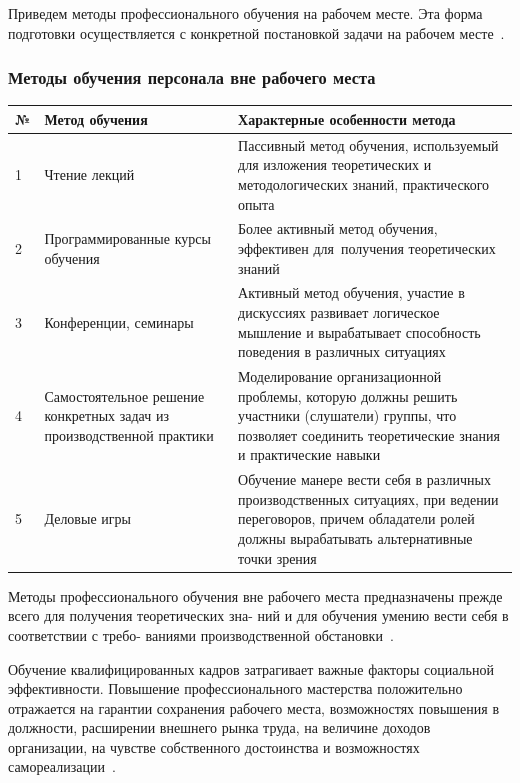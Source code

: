 \documentclass{../industrial-development}
\begin{document}
Приведем методы профессионального обучения на рабочем
месте. Эта форма подготовки осуществляется с конкретной постановкой задачи на рабочем месте~\cite[с.~414]{Kibanov}.

\begin{frame} \frametitle{Методы обучения персонала вне рабочего места}

		\begin{table}[h]
\begin{center}
\begin{tabular}{|p{}|p{4cm}|p{5cm}|}
\hline
\tiny \textbf{№} & \tiny \textbf{Метод обучения} & \tiny \textbf{Характерные особенности метода} \\
\hline
\tiny 1 & \tiny Чтение лекций & \tiny Пассивный метод обучения, используемый для изложения теоретических и методологических знаний, практического опыта  \\
\hline
\tiny 2 & \tiny Программированные курсы обучения & \tiny Более активный метод обучения, эффективен для~получения теоретических знаний  \\
\hline
\tiny 3 & \tiny Конференции, семинары & \tiny Активный метод обучения, участие в дискуссиях развивает логическое мышление и вырабатывает способность поведения в различных ситуациях \\
\hline
\tiny 4 & \tiny Самостоятельное решение конкретных задач из производственной практики & \tiny Моделирование организационной проблемы, которую должны решить участники (слушатели) группы, что позволяет соединить теоретические знания и практические навыки  \\
\hline
\tiny 5 & \tiny Деловые игры & \tiny Обучение манере вести себя в различных производственных ситуациях, при ведении переговоров, причем обладатели ролей должны вырабатывать альтернативные точки зрения  \\
\hline
\end{tabular}
\end{center}
\end{table}

\end{frame}
\lecturenotes

Методы профессионального обучения вне рабочего места
предназначены прежде всего для получения теоретических зна-
ний и для обучения умению вести себя в соответствии с требо-
ваниями производственной обстановки~\cite[с.~414]{Kibanov}.

Обучение квалифицированных кадров затрагивает важные факторы социальной эффективности. Повышение профессионального мастерства положительно отражается на гарантии сохранения рабочего места, возможностях повышения в должности, расширении внешнего рынка труда, на величине доходов организации, на чувстве
собственного достоинства и возможностях самореализации~\cite[с.~416]{Kibanov}.
\end{document}
